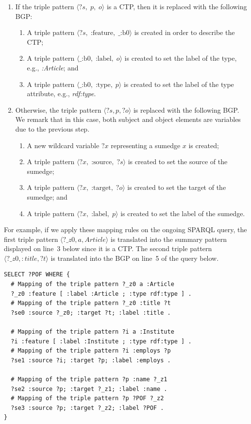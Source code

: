 \begin{enumerate}
	\item If the triple pattern $\langle ?s,\; p,\; o \rangle$ is a CTP, then it is replaced with the following BGP:
	\begin{enumerate}
		\item A triple pattern $\langle ?s,\; \text{:feature},\; \text{\_:b0} \rangle$ is created in order to describe the CTP;
		\item A triple pattern $\langle \text{\_:b0},\;\text{:label},\; o \rangle$ is created to set the label of the type, e.g., \emph{:Article}; and
		\item A triple pattern $\langle \text{\_:b0},\;\text{:type},\; p \rangle$ is created to set the label of the type attribute, e.g., \emph{rdf:type}.
	\end{enumerate}
\item Otherwise, the triple pattern \mbox{$\langle ?s, p, ?o \rangle$} is replaced with the following BGP. We remark that in this case, both subject and object elements are variables due to the previous step.
	\begin{enumerate}
		\item A new wildcard variable $?x$ representing a sumedge $x$ is created;
		\item A triple pattern $\langle ?x,\; \text{:source},\; ?s \rangle$ is created to set the source of the sumedge;
		\item A triple pattern $\langle ?x,\; \text{:target},\; ?o \rangle$ is created to set the target of the sumedge; and
		\item A triple pattern $\langle ?x,\; \text{:label},\; p \rangle$ is created to set the label of the sumedge.
	\end{enumerate}
\end{enumerate}

For example, if we apply these mapping rules on the ongoing SPARQL query, the first triple pattern \mbox{$\langle ?\_z0, a, Article \rangle$} is translated into the summary pattern displayed on line~3 below since it is a CTP. The second triple pattern \mbox{$\langle ?\_z0, :title, ?t \rangle$} is translated into the BGP on line~5 of the query below.

\begin{verbatim}
SELECT ?POF WHERE {
  # Mapping of the triple pattern ?_z0 a :Article
  ?_z0 :feature [ :label :Article ; :type rdf:type ] .
  # Mapping of the triple pattern ?_z0 :title ?t
  ?se0 :source ?_z0; :target ?t; :label :title .
 
  # Mapping of the triple pattern ?i a :Institute
  ?i :feature [ :label :Institute ; :type rdf:type ] .
  # Mapping of the triple pattern ?i :employs ?p
  ?se1 :source ?i; :target ?p; :label :employs .
 
  # Mapping of the triple pattern ?p :name ?_z1
  ?se2 :source ?p; :target ?_z1; :label :name .
  # Mapping of the triple pattern ?p ?POF ?_z2
  ?se3 :source ?p; :target ?_z2; :label ?POF .
}
\end{verbatim}

